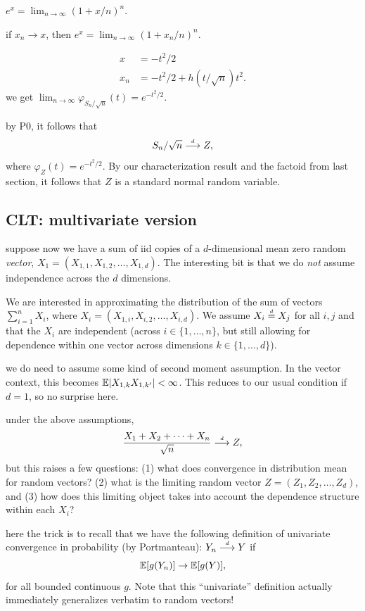 \documentclass{article}
\begin{document}
 $e^x = \lim_{n\to\infty} (1 + x/n)^n$.

 if $x_n \to x$, then $e^x = \lim_{n\to\infty} (1 + x_n/n)^n$.

\begin{align*}
x &= -t^2/2 \\
x_n &= -t^2/2 + h(t/\sqrt{n}) t^2.
\end{align*}
we get $\lim_{n\to\infty} \varphi_{S_n/\sqrt{n}}(t) = e^{-t^2/2}$.

 by P0, it follows that 
\[ S_n / \sqrt{n} \stackrel{\scriptscriptstyle d}{\longrightarrow} Z, \]
where $\varphi_Z(t) = e^{-t^2/2}$. By our characterization result and the factoid from last section, it follows that $Z$ is a standard normal random variable.


\subsection{CLT: multivariate version}

 suppose now we have a sum of iid copies of a $d$-dimensional mean zero random \emph{vector}, $X_1 = (X_{1,1}, X_{1,2}, \dots, X_{1,d})$. The interesting bit is that we do \emph{not} assume independence across the $d$ dimensions. 

 We are interested in approximating the distribution of the sum of vectors $\sum_{i=1}^n X_i$, where $X_i = (X_{1,i}, X_{i,2}, \dots, X_{i,d})$. We assume $X_i \stackrel{\scriptscriptstyle d}{=} X_j$ for all $i,j$ and that the $X_i$ are independent (across $i \in \{1, \dots, n\}$, but still allowing for dependence within one vector across dimensions $k \in \{1, \dots, d\}$).

 we do need to assume some kind of second moment assumption. In the vector context, this becomes ${\mathbb E}|X_{1,k} X_{1,k'}| < \infty$. This reduces to our usual condition if $d=1$, so no surprise here.

 under the above assumptions,
\[ \frac{X_1 + X_2 + \dots + X_n}{\sqrt{n}} \stackrel{\scriptscriptstyle d}{\longrightarrow} Z, \]
but this raises a few questions: (1) what does convergence in distribution mean for random vectors? (2) what is the limiting random vector $Z = (Z_1, Z_2, \dots, Z_d)$, and (3) how does this limiting object takes into account the dependence structure within each $X_i$?

 here the trick is to recall that we have the following definition of univariate convergence in probability (by Portmanteau): $Y_n \stackrel{\scriptscriptstyle d}{\longrightarrow} Y$ if
\[ {\mathbb E}[g(Y_n)] \to {\mathbb E}[g(Y)], \]
for all bounded continuous $g$. Note that this ``univariate'' definition actually immediately generalizes verbatim to random vectors!
\end{document}
